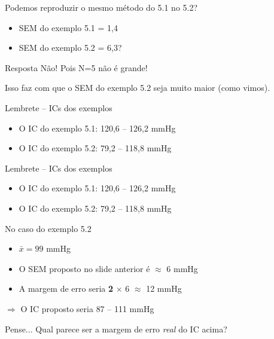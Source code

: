 \documentclass{beamer}
\begin{document}
\begin{frame}{\scriptsize }
    \begin{block}{Podemos reproduzir o mesmo método do 5.1 no 5.2?}
    \footnotesize
  \begin{itemize}
  \item SEM do exemplo 5.1 = 1,4
  \item SEM do exemplo 5.2 = 6,3?
  \end{itemize}
  \end{block}
  \begin{block}{Resposta}
    \footnotesize
    Não! Pois N=5 não é grande!

    \bigskip
    Isso faz com que o SEM do exemplo 5.2 seja muito maior (como vimos).
  \end{block}
  \begin{exampleblock}{Lembrete -- ICs dos exemplos}
    \footnotesize
    \begin{itemize}
    \item O IC do exemplo 5.1: 120,6 -- 126,2 mmHg
    \item O IC do exemplo 5.2: 79,2 -- 118,8 mmHg
    \end{itemize}
  \end{exampleblock}
\end{frame}

\begin{frame}{\scriptsize }
  \begin{exampleblock}{Lembrete -- ICs dos exemplos}
    \footnotesize
    \begin{itemize}
    \item O IC do exemplo 5.1: 120,6 -- 126,2 mmHg
    \item O IC do exemplo 5.2: \alert{79,2 -- 118,8 mmHg}
    \end{itemize}
  \end{exampleblock}
  \begin{block}{No caso do exemplo 5.2}
    \footnotesize
    \begin{itemize}
    \item $\bar{x} = 99$ mmHg
    \item O SEM proposto no slide anterior é $\approx$ 6 mmHg
    \item A margem de erro seria {\bf 2} $\times $ 6 $\approx$ 12 mmHg
    \end{itemize}
      $\Rightarrow$ O IC proposto seria \alert{87 -- 111 mmHg}
  \end{block}
  \begin{block}{Pense...}
    \footnotesize
    Qual parece ser a margem de erro {\em real} do IC acima?
  \end{block}
\end{frame}
\end{document}
